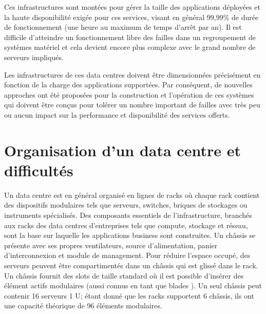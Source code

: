 Ces infrastructures sont montées pour gérer la taille des applications déployées et la haute disponibilité exigée pour ces services, visant en général 99,99\% de durée de fonctionnement (une heure au maximum de temps d'arrêt par an). Il est difficile d'atteindre un fonctionnement libre des failles dans un regroupement de systèmes matériel et cela devient encore plus complexe avec le grand nombre de serveurs impliqués.

\par
Les infrastructures de ces data centres doivent être dimensionnées précisément  en fonction de la charge des applications supportées. Par conséquent, de nouvelles approches ont été proposées pour la construction et l'opération de ces systèmes qui doivent être conçus pour tolérer un nombre important de failles avec très peu ou aucun impact sur la performance et disponibilité des services offerts. \cite{understandingCloudWhatDC}  \cite{datacenterAsComputerIntro}

\section{Organisation d'un data centre et difficultés}

Un data centre est en général organisé en lignes de racks où chaque rack contient des dispositifs modulaires tels que serveurs, switches, briques de stockages ou instruments spécialisés. %
Des composants essentiels de l'infrastructure, branchés aux racks des data centres d'entreprises tels que compute, stockage et réseau, sont la base sur laquelle les applications business sont construites. Un châssis se présente avec ses propres ventilateurs, source d'alimentation, panier d'interconnexion et module de management. 
Pour réduire l'espace occupé, des serveurs peuvent être compartimentés dans un châssis qui est glissé dans le rack. Un châssis fournit des slots de taille standard où il est possible d'insérer des élément actifs modulaires (aussi connus en tant que \og blades \fg{}). Un seul châssis peut contenir 16 serveurs 1 U; étant donné que les racks supportent 6 châssis, ils ont une capacité théorique de 96 éléments modulaires.


